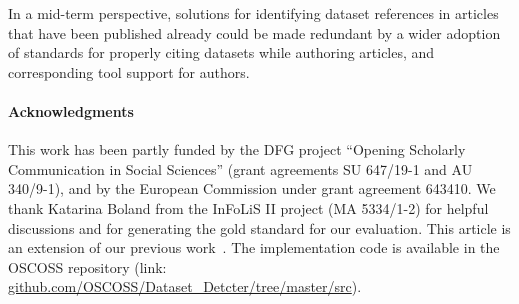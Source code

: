 \documentclass{IOS-Book-Article}
\begin{document}
In a mid-term perspective, solutions for identifying dataset references in articles that have been published already could be made redundant by a wider adoption of standards for properly citing datasets while authoring articles, and corresponding tool support for authors.

\paragraph{Acknowledgments}
This work has been partly funded by the DFG project “Opening Scholarly Communication in Social Sciences” 
(grant agreements SU 647/19-1 and AU 340/9-1), and by the European Commission under grant agreement 643410. 
We thank Katarina Boland from the InFoLiS II project (MA 5334/1-2) for helpful discussions and for generating the gold standard for our evaluation. 
This article is an extension of our previous work~\cite{ghavimi2016identifying}.
The implementation code is available in the OSCOSS repository (link: \url{github.com/OSCOSS/Dataset_Detcter/tree/master/src}). 


\end{document}
